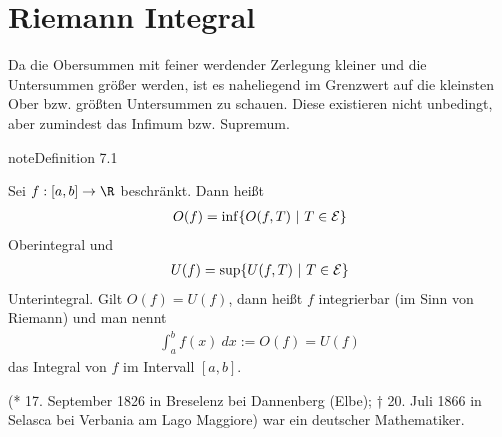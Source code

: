 \documentclass[letterpaper,10pt,english]{jupyterBook}
\begin{document}
\section{Riemann Integral}
\label{\detokenize{integration/riemann:riemann-integral}}\label{\detokenize{integration/riemann::doc}}
Da die Obersummen mit feiner werdender Zerlegung kleiner und die Untersummen größer werden, ist es naheliegend im Grenzwert auf die kleinsten Ober\sphinxhyphen{} bzw. größten Untersummen zu schauen. Diese existieren nicht unbedingt, aber zumindest das Infimum bzw. Supremum.
\label{integration/riemann:definition-0}
\begin{sphinxadmonition}{note}{Definition 7.1}



Sei \(f:[a,b] \rightarrow \R\) beschränkt. Dann heißt
\begin{equation*}
\begin{split} O(f) = \inf\{ O(f,T)~|~ T \in {\cal E} \} \end{split}
\end{equation*}
Oberintegral und
\begin{equation*}
\begin{split} U(f) =  \sup\{ U(f,T)~|~ T \in {\cal E} \} \end{split}
\end{equation*}
Unterintegral.
Gilt \(O(f) = U(f)\), dann heißt \(f\) integrierbar (im Sinn von Riemann) und man nennt
\begin{equation*}
\begin{split} \int_a^b f(x)~dx := O(f) = U(f)\end{split}
\end{equation*}
das Integral von \(f\) im Intervall \([a,b]\).
\end{sphinxadmonition}

\begin{sphinxShadowBox}

 (* 17. September 1826 in Breselenz bei Dannenberg (Elbe); † 20. Juli 1866 in Selasca bei Verbania am Lago Maggiore) war ein deutscher Mathematiker.
\end{sphinxShadowBox}
\end{document}
